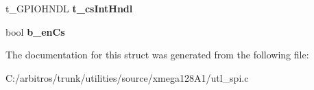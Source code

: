 \begin{DoxyCompactItemize}
\item 
\hypertarget{structt__spi_user_hndl_a7f656ec494a161fda160b296d30762f8}{t\-\_\-\-G\-P\-I\-O\-H\-N\-D\-L {\bfseries t\-\_\-cs\-Int\-Hndl}}\label{structt__spi_user_hndl_a7f656ec494a161fda160b296d30762f8}

\item 
\hypertarget{structt__spi_user_hndl_a52baa3da41fd7bf162ea3925c44e8973}{bool {\bfseries b\-\_\-en\-Cs}}\label{structt__spi_user_hndl_a52baa3da41fd7bf162ea3925c44e8973}

\end{DoxyCompactItemize}


The documentation for this struct was generated from the following file\-:\begin{DoxyCompactItemize}
\item 
C\-:/arbitros/trunk/utilities/source/xmega128\-A1/utl\-\_\-spi.\-c\end{DoxyCompactItemize}
